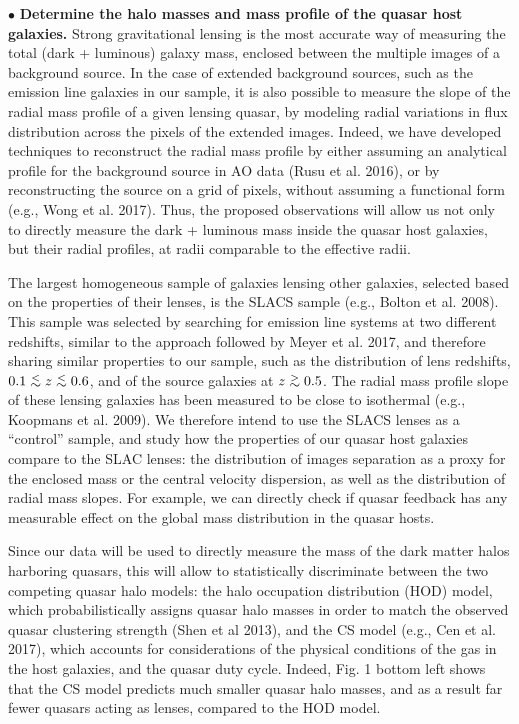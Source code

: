 \documentclass[a4paper,11pt]{article}
\newcommand{\gtrsim}{\lower.5ex\hbox{$\; \buildrel > \over \sim \;$}}
\newcommand{\lesssim}{\lower.5ex\hbox{$\; \buildrel < \over \sim \;$}}
\begin{document}
$\bullet$ {\bf Determine the halo masses and mass profile of the quasar host galaxies.} Strong gravitational lensing is the most accurate way of measuring the total (dark + luminous) galaxy mass, enclosed between the multiple images of a background source. In the case of extended background sources, such as the emission line galaxies in our sample, it is also possible to measure the slope of the radial mass profile of a given lensing quasar, by modeling radial variations in flux distribution across the pixels of the extended images. Indeed, we have developed techniques to reconstruct the radial mass profile by either assuming an analytical profile for the background source in AO data (Rusu et al. 2016), or by reconstructing the source on a grid of pixels, without assuming a functional form (e.g., Wong et al. 2017). Thus, the proposed observations will allow us not only to directly measure the dark + luminous mass inside the quasar host galaxies, but their radial profiles, at radii comparable to the effective radii. 

The largest homogeneous sample of galaxies lensing other galaxies, selected based on the properties of their lenses, is the SLACS sample (e.g., Bolton et al. 2008). This sample was selected by searching for emission line systems at two different redshifts, similar to the approach followed by Meyer et al. 2017, and therefore sharing similar properties to our sample, such as the distribution of lens redshifts, $0.1\lesssim z \lesssim 0.6$, and of the source galaxies at $z\gtrsim0.5$. The radial mass profile slope of these lensing galaxies has been measured to be close to isothermal (e.g., Koopmans et al. 2009). We therefore intend to use the SLACS lenses as a ``control'' sample, and study how the properties of our quasar host galaxies compare to the SLAC lenses: the distribution of images separation as a proxy for the enclosed mass or the central velocity dispersion, as well as the distribution of radial mass slopes. For example, we can directly check if quasar feedback has any measurable effect on the global mass distribution in the quasar hosts. 

Since our data will be used to directly measure the mass of the dark matter halos harboring quasars, this will allow to statistically discriminate between the two competing quasar halo models: the halo occupation distribution (HOD) model, which probabilistically assigns quasar halo masses in order to match the observed quasar clustering strength (Shen et al 2013), and the CS model (e.g., Cen et al. 2017), which accounts for considerations of the physical conditions of the gas in the host galaxies, and the quasar duty cycle. Indeed, Fig. 1 bottom left shows that the CS model predicts much smaller quasar halo masses, and as a result far fewer quasars acting as lenses, compared to the HOD model. 
\end{document}

